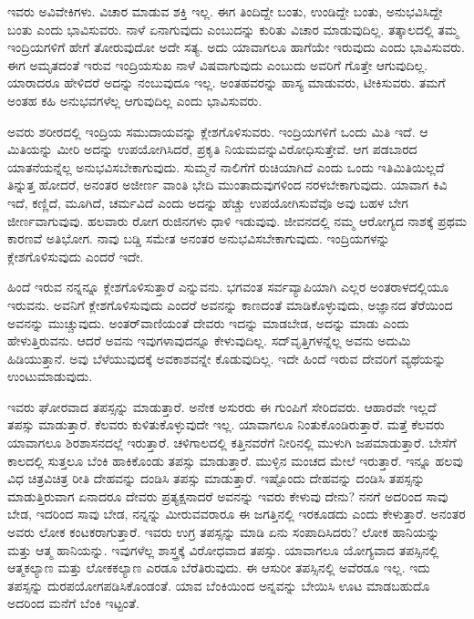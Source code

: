 ಇವರು ಅವಿವೇಕಿಗಳು. ವಿಚಾರ ಮಾಡುವ ಶಕ್ತಿ ಇಲ್ಲ. ಈಗ ತಿಂದಿದ್ದೇ ಬಂತು, ಉಂಡಿದ್ದೇ ಬಂತು, ಅನುಭವಿಸಿದ್ದೇ ಬಂತು ಎಂದು ಭಾವಿಸುವರು. ನಾಳೆ ಏನಾಗುವುದು ಎಂಬುದನ್ನು ಕುರಿತು ವಿಚಾರ ಮಾಡುವುದಿಲ್ಲ. ತತ್ಕಾಲದಲ್ಲಿ ತಮ್ಮ ಇಂದ್ರಿಯಗಳಿಗೆ ಹೇಗೆ ತೋರುವುದೋ ಅದೇ ಸತ್ಯ. ಅದು ಯಾವಾಗಲೂ ಹಾಗೆಯೇ ಇರುವುದು ಎಂದು ಭಾವಿಸುವರು. ಈಗ ಅಮೃತದಂತೆ ಇರುವ ಇಂದ್ರಿಯಸುಖ ನಾಳೆ ವಿಷವಾಗುವುದು ಎಂಬುದು ಅವರಿಗೆ ಗೊತ್ತೇ ಆಗುವುದಿಲ್ಲ. ಯಾರಾದರೂ ಹೇಳಿದರೆ ಅದನ್ನು ನಂಬುವುದೂ ಇಲ್ಲ. ಅಂತಹವರನ್ನು ಹಾಸ್ಯ ಮಾಡುವರು, ಟೀಕಿಸುವರು. ತಮಗೆ ಅಂತಹ ಕಹಿ ಅನುಭವಗಳೆಲ್ಲ ಆಗುವುದಿಲ್ಲ ಎಂದು ಭಾವಿಸುವರು.

ಅವರು ಶರೀರದಲ್ಲಿ ಇಂದ್ರಿಯ ಸಮುದಾಯವನ್ನು ಕ್ಲೇಶಗೊಳಿಸುವರು. ಇಂದ್ರಿಯಗಳಿಗೆ ಒಂದು ಮಿತಿ ಇದೆ. ಆ ಮಿತಿಯನ್ನು ಮೀರಿ ಅದನ್ನು ಉಪಯೋಗಿಸಿದರೆ, ಪ್ರಕೃತಿ ನಿಯಮವನ್ನು\break ವಿರೋಧಿಸುತ್ತೇವೆ. ಆಗ ಪಡಬಾರದ ಯಾತನೆಯನ್ನೆಲ್ಲ ಅನುಭವಿಸಬೇಕಾಗುವುದು. ಸುಮ್ಮನೆ ನಾಲಿಗೆಗೆ ರುಚಿಯಾಗಿದೆ ಎಂದು ಒಂದು ಇತಿಮಿತಿಯಿಲ್ಲದೆ ತಿನ್ನುತ್ತ ಹೋದರೆ, ಅನಂತರ ಅಜೀರ್ಣ ವಾಂತಿ ಭೇದಿ ಮುಂತಾದುವುಗಳಿಂದ ನರಳಬೇಕಾಗುವುದು. ಯಾವಾಗ ಕಿವಿ ಇದೆ, ಕಣ್ಣಿದೆ, ಮೂಗಿದೆ, ಚರ್ಮವಿದೆ ಎಂದು ಅದನ್ನು ಹೆಚ್ಚು ಉಪಯೋಗಿಸುವೆವೊ ಅವು ಬಹಳ ಬೇಗ ಜೀರ್ಣವಾಗುವುವು. ಹಲವಾರು ರೋಗ ರುಜಿನಗಳು ಧಾಳಿ ಇಡುವುವು. ಜೀವನದಲ್ಲಿ ನಮ್ಮ ಆರೋಗ್ಯದ ನಾಶಕ್ಕೆ ಪ್ರಥಮ ಕಾರಣವೆ ಅತಿಭೋಗ. ನಾವು ಬಡ್ಡಿ ಸಮೇತ ಅನಂತರ ಅನುಭವಿಸಬೇಕಾಗುವುದು. ಇಂದ್ರಿಯಗಳನ್ನು ಕ್ಲೇಶಗೊಳಿಸುವುದು ಎಂದರೆ ಇದೇ.

ಹಿಂದೆ ಇರುವ ನನ್ನನ್ನೂ ಕ್ಲೇಶಗೊಳಿಸುತ್ತಾರೆ ಎನ್ನುವನು. ಭಗವಂತ ಸರ್ವವ್ಯಾಪಿಯಾಗಿ ಎಲ್ಲರ ಅಂತರಾಳದಲ್ಲಿಯೂ ಇರುವನು. ಅವನಿಗೆ ಕ್ಲೇಶಗೊಳಿಸುವುದು ಎಂದರೆ ಅವನನ್ನು ಕಾಣದಂತೆ ಮಾಡಿಕೊಳ್ಳುವುದು, ಅಜ್ಞಾನದ ತೆರೆಯಿಂದ ಅವನನ್ನು ಮುಚ್ಚುವುದು. ಅಂತರ್​ವಾಣಿ\-ಯಂತೆ ದೇವರು ಇದನ್ನು ಮಾಡಬೇಡ, ಅದನ್ನು ಮಾಡು ಎಂದು ಹೇಳುತ್ತಿರುವನು. ಆದರೆ ಅವನು ಇವುಗಳಾವುದನ್ನೂ ಕೇಳುವುದಿಲ್ಲ. ಸದ್​ವೃತ್ತಿಗಳನ್ನೆಲ್ಲ ಅವನು ಅದುಮಿ ಹಿಡಿಯುತ್ತಾನೆ. ಅವು ಬೆಳೆಯುವುದಕ್ಕೆ ಅವಕಾಶವನ್ನೇ ಕೊಡುವುದಿಲ್ಲ. ಇದೇ ಹಿಂದೆ ಇರುವ ದೇವರಿಗೆ ವ್ಯಥೆಯನ್ನು ಉಂಟುಮಾಡುವುದು.

ಇವರು ಘೋರವಾದ ತಪಸ್ಸನ್ನು ಮಾಡುತ್ತಾರೆ. ಅನೇಕ ಅಸುರರು ಈ ಗುಂಪಿಗೆ ಸೇರಿದವರು. ಆಹಾರವೇ ಇಲ್ಲದೆ ತಪಸ್ಸು ಮಾಡುತ್ತಾರೆ. ಕೆಲವರು ಕುಳಿತುಕೊಳ್ಳುವುದೇ ಇಲ್ಲ. ಯಾವಾಗಲೂ ನಿಂತುಕೊಂಡಿರುತ್ತಾರೆ. ಮತ್ತೆ ಕೆಲವರು ಯಾವಾಗಲೂ ಶಿರಶಾಸನದಲ್ಲೆ ಇರುತ್ತಾರೆ. ಚಳಿಗಾಲದಲ್ಲಿ ಕತ್ತಿನವರೆಗೆ ನೀರಿನಲ್ಲಿ ಮುಳುಗಿ ಜಪಮಾಡುತ್ತಾರೆ. ಬೇಸೆಗೆ ಕಾಲದಲ್ಲಿ ಸುತ್ತಲೂ ಬೆಂಕಿ ಹಾಕಿಕೊಂಡು ತಪಸ್ಸು ಮಾಡುತ್ತಾರೆ. ಮುಳ್ಳಿನ ಮಂಚದ ಮೇಲೆ ಇರುತ್ತಾರೆ. ಇನ್ನೂ ಹಲವು ವಿಧ ಚಿತ್ರವಿಚಿತ್ರ ರೀತಿ ದೇಹವನ್ನು ದಂಡಿಸಿ ತಪಸ್ಸು ಮಾಡುತ್ತಾರೆ. ಇಷ್ಟೊಂದು ದೇಹವನ್ನು ದಂಡಿಸಿ ತಪಸ್ಸನ್ನು ಮಾಡುತ್ತಿರುವಾಗ ಏನಾದರೂ ದೇವರು ಪ್ರತ್ಯಕ್ಷನಾದರೆ ಅವನನ್ನು ಇವರು ಕೇಳುವು ದೇನು? ನನಗೆ ಅದರಿಂದ ಸಾವು ಬೇಡ, ಇದರಿಂದ ಸಾವು ಬೇಡ, ನನ್ನನ್ನು ಮೀರುವವರಾರೂ ಈ ಜಗತ್ತಿನಲ್ಲಿ ಇರಕೂಡದು ಎಂದು ಕೇಳುತ್ತಾರೆ. ಅನಂತರ ಅವರು ಲೋಕ ಕಂಟಕರಾಗುತ್ತಾರೆ. ಇವರು ಉಗ್ರ ತಪಸ್ಸನ್ನು ಮಾಡಿ ಏನು ಸಂಪಾದಿಸಿದರು? ಲೋಕ ಹಾನಿಯನ್ನು ಮತ್ತು ಆತ್ಮ ಹಾನಿಯನ್ನು. ಇವುಗಳೆಲ್ಲ ಶಾಸ್ತ್ರಕ್ಕೆ ವಿರೋಧವಾದ ತಪಸ್ಸು. ಯಾವಾಗಲೂ ಯೋಗ್ಯವಾದ ತಪಸ್ಸಿನಲ್ಲಿ ಆತ್ಮಕಲ್ಯಾಣ ಮತ್ತು ಲೋಕಕಲ್ಯಾಣ ಎರಡೂ ಬೆರೆತಿರುವುದು. ಈ ಆಸುರೀ ತಪಸ್ಸಿನಲ್ಲಿ ಅವೆರಡೂ ಇಲ್ಲ. ಇದು ತಪಸ್ಸನ್ನು ದುರಪಯೋಗಪಡಿಸಿಕೊಂಡಂತೆ. ಯಾವ ಬೆಂಕಿಯಿಂದ ಅನ್ನವನ್ನು ಬೇಯಿಸಿ ಊಟ ಮಾಡಬಹುದೊ ಅದರಿಂದ ಮನೆಗೆ ಬೆಂಕಿ ಇಟ್ಟಂತೆ.

